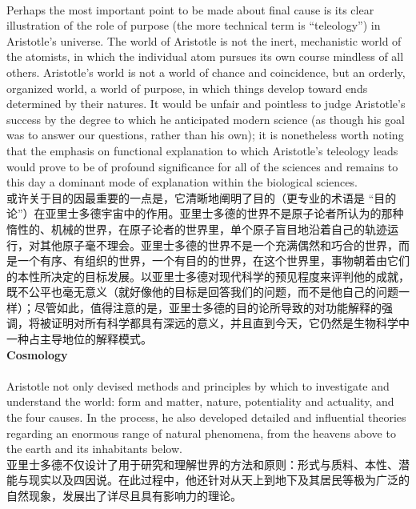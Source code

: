 \documentclass{article}
\begin{document}
\\
Perhaps the most important point to be made about final cause is its clear illustration of the role of purpose (the more technical term is “teleology”) in Aristotle’s universe. The world of Aristotle is not the inert, mechanistic world of the atomists, in which the individual atom pursues its own course mindless of all others. Aristotle’s world is not a world of chance and coincidence, but an orderly, organized world, a world of purpose, in which things develop toward ends determined by their natures. It would be unfair and pointless to judge Aristotle’s success by the degree to which he anticipated modern science (as though his goal was to answer our questions, rather than his own); it is nonetheless worth noting that the emphasis on functional explanation to which Aristotle’s teleology leads would prove to be of profound significance for all of the sciences and remains to this day a dominant mode of explanation within the biological sciences.\\
或许关于目的因最重要的一点是，它清晰地阐明了目的（更专业的术语是 “目的论”）在亚里士多德宇宙中的作用。亚里士多德的世界不是原子论者所认为的那种惰性的、机械的世界，在原子论者的世界里，单个原子盲目地沿着自己的轨迹运行，对其他原子毫不理会。亚里士多德的世界不是一个充满偶然和巧合的世界，而是一个有序、有组织的世界，一个有目的的世界，在这个世界里，事物朝着由它们的本性所决定的目标发展。以亚里士多德对现代科学的预见程度来评判他的成就，既不公平也毫无意义（就好像他的目标是回答我们的问题，而不是他自己的问题一样）；尽管如此，值得注意的是，亚里士多德的目的论所导致的对功能解释的强调，将被证明对所有科学都具有深远的意义，并且直到今天，它仍然是生物科学中一种占主导地位的解释模式。\\

\noindent\textbf{Cosmology}\\
\\
Aristotle not only devised methods and principles by which to investigate and understand the world: form and matter, nature, potentiality and actuality, and the four causes. In the process, he also developed detailed and influential theories regarding an enormous range of natural phenomena, from the heavens above to the earth and its inhabitants below.\\
亚里士多德不仅设计了用于研究和理解世界的方法和原则：形式与质料、本性、潜能与现实以及四因说。在此过程中，他还针对从天上到地下及其居民等极为广泛的自然现象，发展出了详尽且具有影响力的理论。\\
\end{document}
